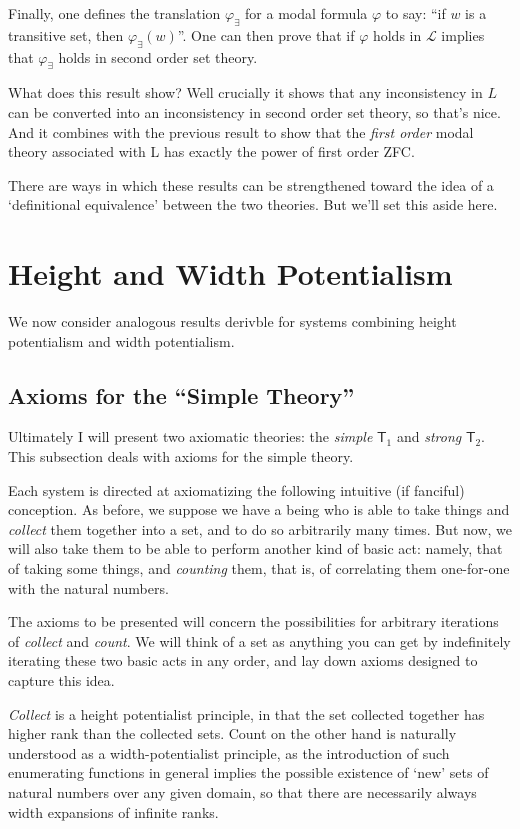 \documentclass{article}
\begin{document}
Finally, one defines the translation $\varphi_\exists$ for a modal formula $\varphi$ 
to say: ``if $w$ is a transitive set, then $\varphi_\exists(w)$''.
One can then prove that if $\varphi$ holds in $\mathcal{L}$ implies that 
$\varphi_\exists$ holds in second order set theory.

What does this result show? Well crucially it shows that any inconsistency in 
$L$ can be converted into an inconsistency in second order set theory, 
so that's nice. And it combines with the previous result to show that the 
\emph{first order} modal theory associated with L has exactly the power 
of first order ZFC.

There are ways in which these results can be strengthened toward the idea of a 
`definitional equivalence' between the two theories. But we'll set this aside here.



\section{Height and Width Potentialism}
We now consider analogous results derivble for systems combining height potentialism 
and width potentialism.

\subsection{Axioms for the ``Simple Theory''}
Ultimately I will present two axiomatic theories: 
the \emph{simple} $\mathsf{T}_1$ and \emph{strong} $\mathsf{T}_2$.
This subsection deals with axioms for the simple theory.

Each system is directed at axiomatizing the following intuitive (if fanciful) conception.
As before, we suppose we have a being who is able to take things and \emph{collect} 
them together into a set, and to do so arbitrarily many times.
But now, we will also take them to be able to perform another kind of basic act: namely, 
that of taking some things, and \emph{counting} them, that is, 
of correlating them one-for-one
with the natural numbers. 

The axioms to be presented
will concern the possibilities for arbitrary iterations 
of \emph{collect} and \emph{count}. We will think of a set as anything 
you can get by indefinitely iterating these two basic acts in any order,
and lay down axioms designed to capture this idea.

\emph{Collect} is a height potentialist 
principle, in that the set collected together has higher rank than the collected sets.
Count on the other hand is naturally understood as a width-potentialist principle, 
as the introduction of such enumerating functions in general implies the possible 
existence of `new' sets of natural numbers over any given domain, so that there are necessarily 
always width expansions of infinite ranks. 
\end{document}

